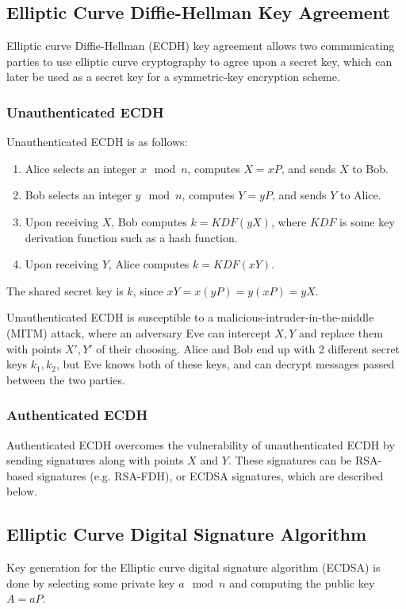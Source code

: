 \documentclass[12pt,titlepage]{article}
\begin{document}
    \subsection{Elliptic Curve Diffie-Hellman Key Agreement}
      Elliptic curve Diffie-Hellman (ECDH) key agreement allows two communicating parties to use elliptic curve cryptography to agree upon a secret
      key, which can later be used as a secret key for a symmetric-key encryption scheme.

      \subsubsection{Unauthenticated ECDH}
        Unauthenticated ECDH is as follows:
        \begin{enumerate}
          \item Alice selects an integer $x \mod n$, computes $X = xP$, and sends $X$ to Bob.
          \item Bob selects an integer $y \mod n$, computes $Y = yP$, and sends $Y$ to Alice.
          \item Upon receiving $X$, Bob computes $k = KDF(yX)$, where $KDF$ is some key derivation function such as a hash function.
          \item Upon receiving $Y$, Alice computes $k = KDF(xY)$.
        \end{enumerate}

        The shared secret key is $k$, since $xY = x(yP) = y(xP) = yX$.

        Unauthenticated ECDH is susceptible to a malicious-intruder-in-the-middle (MITM) attack, where an adversary Eve can intercept $X, Y$ and replace
        them with points $X', Y'$ of their choosing. Alice and Bob end up with 2 different secret keys $k_1, k_2$, but Eve knows both of these keys, and
        can decrypt messages passed between the two parties.

      \subsubsection{Authenticated ECDH}
        Authenticated ECDH overcomes the vulnerability of unauthenticated ECDH by sending signatures along with points $X$ and $Y$. These signatures can
        be RSA-based signatures (e.g. RSA-FDH), or ECDSA signatures, which are described below.

    \subsection{Elliptic Curve Digital Signature Algorithm}
      Key generation for the Elliptic curve digital signature algorithm (ECDSA) is done by selecting some private key $a \mod n$ and computing the public
      key $A = aP$.
\end{document}
